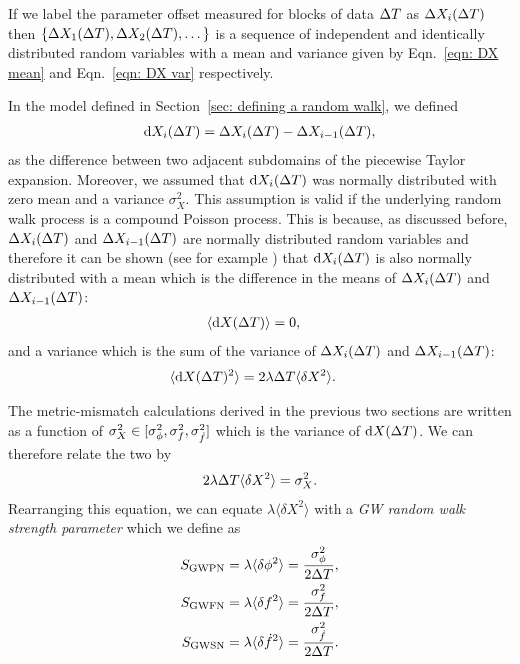 \documentclass[../full_thesis/full_thesis.tex]{subfiles}
\begin{document}
{If we label the parameter offset measured for blocks of data $\Delta T$ as  $\Delta
X_{i}(\Delta T)$ then $\{\Delta X_{1}(\Delta T), \Delta X_{2}(\Delta T), \dots\}$ is a
sequence of independent and identically distributed random variables with a mean
and variance given by Eqn.~\eqref{eqn: DX mean} and Eqn.~\eqref{eqn: DX var}
respectively.

In the model defined in Section~\ref{sec: defining a random walk}, we defined
\begin{align}
\mathrm{d} X_{i}(\Delta T) =  \Delta X_{i}(\Delta T) - \Delta X_{i-1}(\Delta T),
\end{align}
as the difference between two adjacent subdomains of the piecewise Taylor
expansion. Moreover, we assumed that $\mathrm{d} X_i(\Delta T)$ was normally distributed
with zero mean and a variance $\sigma_{X}^{2}$.  This assumption is valid if
the underlying random walk process is a compound Poisson process. This is
because, as discussed before, $\Delta X_{i}(\Delta T)$ and $\Delta X_{i-1}(\Delta T)$ are
normally distributed random variables and therefore it can be shown (see for
example \citeauthor{wolframdifference}) that $\mathrm{d} X_i (\Delta T)$ is also normally
distributed with a mean which is the difference in the means of
$\Delta X_{i}(\Delta T)$ and $\Delta X_{i-1}(\Delta T)$:
\begin{align}
\langle \mathrm{d} X(\Delta T) \rangle & = 0,
\label{eqn: Poisson expectation}
\end{align}
and a variance which is the sum of the variance of
$\Delta X_{i}(\Delta T)$ and $\Delta X_{i-1}(\Delta T)$:
\begin{align}
\langle \mathrm{d} X(\Delta T)^{2} \rangle &  = 2\lambda \Delta T \langle \delta X^{2}\rangle.
\label{eqn: Poisson variance}
\end{align}

The metric-mismatch calculations derived in the previous two sections are
written as a function of $\sigma_{X}^{2} \in [\sigma_{\phi}^{2}, \sigma_{f}^{2}, \sigma_{\dot{f}}^{2}]$
which is the variance of $\mathrm{d} X(\Delta T)$. We can therefore relate the two by
\begin{align}
2\lambda \Delta T \langle \delta X^{2}\rangle = \sigma_{X}^{2}.
\end{align}
Rearranging this equation, we can equate $\lambda \langle \delta X^2\rangle$ with
a \emph{GW random walk strength parameter} which we define as
\begin{align}
S_{\mathrm{GWPN}} & = \lambda \langle \delta \phi^{2} \rangle = 
\frac{\sigma_{\phi}^{2}}{2\Delta T}, \label{eqn: SPN 2}\\
S_{\mathrm{GWFN}} & = \lambda \langle \delta f^{2} \rangle = 
\frac{\sigma_{f}^{2}}{2\Delta T}, \label{eqn: SFN 2}\\
S_{\mathrm{GWSN}} & = \lambda \langle \delta \dot{f}^{2} \rangle = 
\frac{\sigma_{\dot{f}}^{2}}{2\Delta T}.  \label{eqn: SSN 2}
\end{align}

}
\end{document}
